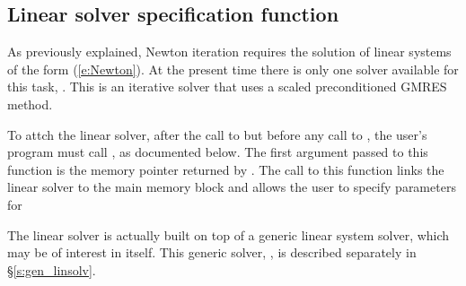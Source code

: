 
\subsection{Linear solver specification function}\label{ss:lin_solv_init}

As previously explained, Newton iteration requires the solution of
linear systems of the form (\ref{e:Newton}).  At the present time
there is only one solver available for this task, {\kinspgmr}. 
This is an iterative solver that uses a scaled preconditioned
GMRES method.

To attch the {\kinspgmr} linear solver, after the call to 
but before any call to , the user's program must call  ,
as documented below. The first argument passed to this function is the {\kinsol}
memory pointer returned by .  The call to this
function links the linear solver to the main {\kinsol} memory block and
allows the user to specify parameters for {\kinspgmr}

The {\kinspgmr} linear solver is actually built on top of a generic
linear system solver, which may be of interest in itself.  This
generic solver, {\spgmr}, is described separately in \S\ref{s:gen_linsolv}.

